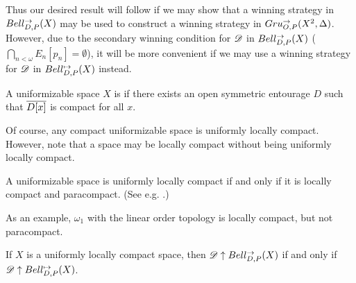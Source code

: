 Thus our desired result will follow if we may show that a winning strategy
in $Bell_{D,P}^{\to}(X)$ may be used to construct a winning strategy in
$Gru_{O,P}^{\to}(X^2,\Delta)$. However, due to the secondary winning condition
for $\mathscr{D}$ in $Bell_{D,P}^{\to}(X)$ ($\bigcap_{n<\omega}E_n[p_n]=\emptyset$),
it will be more convenient if we may use a winning strategy for $\mathscr{D}$
in $Bell_{D,P}^{\mapsto}(X)$ instead.

\begin{defn}
  A uniformizable space $X$ is  if there
  exists an open symmetric entourage $D$ such that $\overline{D[x]}$ is compact
  for all $x$.
\end{defn}

Of course, any compact uniformizable space is uniformly locally compact.
However, note that a space may be locally compact without being uniformly
locally compact.

\begin{thm}
  A uniformizable space is uniformly locally compact if and only if it is
  locally compact and paracompact. (See e.g. \cite{MR2040233}.)
\end{thm}

As an example, $\omega_1$ with the linear order topology is locally compact,
but not paracompact.

\begin{thm}
  If $X$ is a uniformly locally compact space, then
  $\mathscr{D} \uparrow Bell_{D,P}^{\to}(X)$ if and only if
  $\mathscr{D} \uparrow Bell_{D,P}^{\mapsto}(X)$.
\end{thm}

